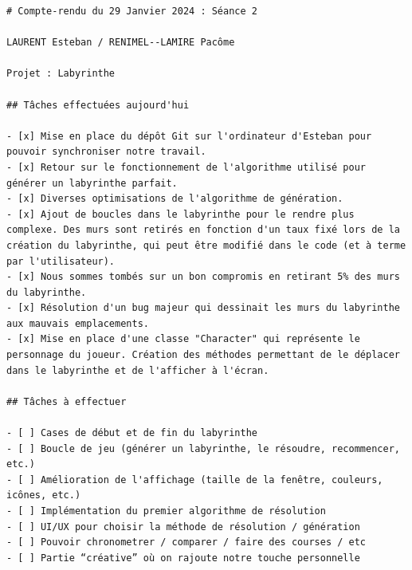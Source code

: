 \documentclass[12pt]{scrreprt} %
\begin{document}
\begin{verbatim}
# Compte-rendu du 29 Janvier 2024 : Séance 2

LAURENT Esteban / RENIMEL--LAMIRE Pacôme

Projet : Labyrinthe

## Tâches effectuées aujourd'hui

- [x] Mise en place du dépôt Git sur l'ordinateur d'Esteban pour pouvoir synchroniser notre travail.
- [x] Retour sur le fonctionnement de l'algorithme utilisé pour générer un labyrinthe parfait.
- [x] Diverses optimisations de l'algorithme de génération.
- [x] Ajout de boucles dans le labyrinthe pour le rendre plus complexe. Des murs sont retirés en fonction d'un taux fixé lors de la création du labyrinthe, qui peut être modifié dans le code (et à terme par l'utilisateur).
- [x] Nous sommes tombés sur un bon compromis en retirant 5% des murs du labyrinthe.
- [x] Résolution d'un bug majeur qui dessinait les murs du labyrinthe aux mauvais emplacements.
- [x] Mise en place d'une classe "Character" qui représente le personnage du joueur. Création des méthodes permettant de le déplacer dans le labyrinthe et de l'afficher à l'écran.

## Tâches à effectuer

- [ ] Cases de début et de fin du labyrinthe
- [ ] Boucle de jeu (générer un labyrinthe, le résoudre, recommencer, etc.)
- [ ] Amélioration de l'affichage (taille de la fenêtre, couleurs, icônes, etc.)
- [ ] Implémentation du premier algorithme de résolution
- [ ] UI/UX pour choisir la méthode de résolution / génération
- [ ] Pouvoir chronometrer / comparer / faire des courses / etc
- [ ] Partie “créative” où on rajoute notre touche personnelle

\end{verbatim}
\end{document}
